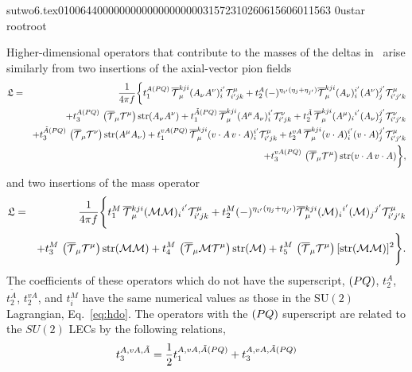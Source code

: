                                                                                                                                                                                                                                                                                       sutwo6.tex                                                                                          0100644 0000000 0000000 00000315723 10260615606 011563  0                                                                                                    ustar   root                            root                                                                                                                                                                                                                   \documentclass[prd,amssymb,amsmath,showpacs,nofootinbib,superscriptaddress]{revtex4}
\begin{document}
Higher-dimensional operators that contribute to the masses of the deltas in \PQCPT\ arise similarly from 
two insertions of the axial-vector pion fields
\begin{eqnarray}
	\mathfrak{L} &=& \frac{1}{4 \pi f} 
		\bigg\{ 
			t_1^{A(PQ)} \, {\overline{{\mathcal T}}}^{kji}_\mu (A_\nu A^\nu)_{i}^{i'} {\mathcal T}^\mu_{i'jk} 
			+ t_2^A   (-)^{\eta_{i'} (\eta_j + \eta_{j'})}  {\overline{{\mathcal T}}}^{kji}_\mu (A_\nu)_{i}^{i'} 							(A^\nu)_{j}^{j'} {\mathcal T}^\mu_{i'j'k} \notag \\
		&& 	+ t_3^{A(PQ)} \, \left( {\overline{{\mathcal T}}}_\mu {\mathcal T}^\mu \right) \text{str} ( A_\nu A^\nu )
			+ t_1^{\tilde{A}(PQ)} \, {\overline{{\mathcal T}}}^{kji}_\mu (A^\mu A_\nu)_{i}^{i'} {\mathcal T}^\nu_{i'jk} 
			+ t_2^{\tilde{A}} \, {\overline{{\mathcal T}}}^{kji}_\mu (A^\mu)_{i}{}^{i'} (A_\nu)_{j}^{j'} {\mathcal T}^\nu_{i'j'k} 
\notag \\
		&&	+ t_3^{\tilde{A}(PQ)} \, \left( {\overline{{\mathcal T}}}_\mu {\mathcal T}^\nu \right) \text{str} ( A^\mu A_\nu )
			+ t_1^{vA(PQ)} \, {\overline{{\mathcal T}}}^{kji}_\mu (v \cdot A \, v \cdot A)_{i}^{i'} {\mathcal T}^\mu_{i'jk} 
			+ t_2^{vA} \, {\overline{{\mathcal T}}}^{kji}_\mu (v \cdot A)_{i}^{i'} (v \cdot A)_{j}^{j'} {\mathcal T}^\mu_{i'j'k} 
\notag \\
		&&	+ t_3^{vA(PQ)} \, \left( {\overline{{\mathcal T}}}_\mu {\mathcal T}^\mu \right) \text{str} ( v \cdot A \, v \cdot A )
		\bigg\}
,\label{eq:hdoPQ}
\end{eqnarray}
and two insertions of the mass operator
\begin{eqnarray}\label{eq:tmatch1}
\mathfrak{L} &=&
\frac{1}{4 \pi f} 
\Bigg\{ 
t_1^M \, {\overline{{\mathcal T}}} {}^{kji}_\mu ({\mathcal M} {\mathcal M})_{i}{}^{i'} {\mathcal T}^\mu_{i'jk} 
+
t_2^M  (-)^{\eta_{i'} (\eta_j + \eta_{j'})} {\overline{{\mathcal T}}} {}^{kji}_\mu ({\mathcal M})_{i}{}^{i'} ({\mathcal M})_{j}{}^{j'} {\mathcal T}^\mu_{i'j'k} 
\notag \\
&& + 
t_3^M  \, \left( {\overline{{\mathcal T}}}_\mu {\mathcal T}^\mu \right) \text{str} ({\mathcal M} {\mathcal M})
+
t_4^M \, \left( {\overline{{\mathcal T}}}_\mu {\mathcal M} {\mathcal T}^\mu \right) \text{str} ({\mathcal M})
+
t_5^M  \, \left( {\overline{{\mathcal T}}}_\mu {\mathcal T}^\mu \right) [\text{str}({\mathcal M}{\mathcal M})]^2
\Bigg\}.
\end{eqnarray}
The coefficients of these operators which do not have the superscript, $(PQ)$, $t_2^{A}$, $t_2^{\tilde{A}}$,
$t_2^{vA}$, and $t_i^{M}$ have the same numerical
values as those in the SU$(2)$ Lagrangian, Eq.~\eqref{eq:hdo}.  The operators with the $(PQ)$ superscript are related to the $SU(2)$ LECs by the following relations,
\begin{equation}\label{eq:tmatch2}
	t_3^{A,vA,\tilde{A}} =
		\frac{1}{2}t_1^{A,vA,\tilde{A} (PQ)} +t_3^{A,vA,\tilde{A} (PQ)}
\end{equation}
\end{document}
